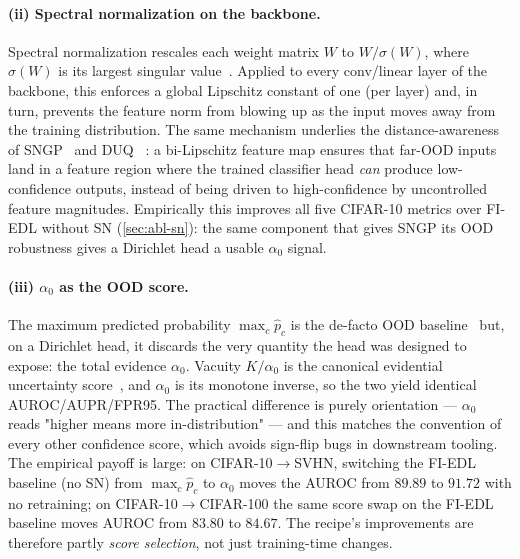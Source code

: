 \documentclass[review,5p,times]{elsarticle}
\begin{document}
\paragraph{(ii) Spectral normalization on the backbone.}
Spectral normalization rescales each weight matrix $W$ to
$W/\sigma(W)$, where $\sigma(W)$ is its largest singular
value~\citep{miyato2018sngan}. Applied to every conv/linear layer of the
backbone, this enforces a global Lipschitz constant of one (per layer) and,
in turn, prevents the feature norm from blowing up as the input moves away
from the training distribution. The same mechanism underlies the
distance-awareness of SNGP~\citep{liu2020sngp} and DUQ
~\citep{vanamersfoort2020duq}: a bi-Lipschitz feature map ensures that
far-OOD inputs land in a feature region where the trained classifier head
\emph{can} produce low-confidence outputs, instead of being driven to
high-confidence by uncontrolled feature magnitudes. Empirically this
improves all five CIFAR-10 metrics over FI-EDL without SN
(\autoref{sec:abl-sn}): the same component that gives SNGP its OOD
robustness gives a Dirichlet head a usable $\alpha_0$ signal.

\paragraph{(iii) $\alpha_0$ as the OOD score.}
The maximum predicted probability $\max_c\hat p_c$ is the de-facto OOD
baseline~\citep{hendrycks2017baseline} but, on a Dirichlet head, it discards
the very quantity the head was designed to expose: the total evidence
$\alpha_0$. Vacuity $K/\alpha_0$ is the canonical evidential uncertainty
score~\citep{sensoy2018edl}, and $\alpha_0$ is its monotone inverse, so the
two yield identical AUROC/AUPR/FPR95. The practical difference is purely
orientation — $\alpha_0$ reads "higher means more in-distribution" — and
this matches the convention of every other confidence score, which avoids
sign-flip bugs in downstream tooling. The empirical payoff is large: on
CIFAR-10$\to$SVHN, switching the FI-EDL baseline (no SN) from
$\max_c\hat p_c$ to $\alpha_0$ moves the AUROC from $89.89$ to $91.72$
with no retraining; on CIFAR-10$\to$CIFAR-100 the same score swap on the
FI-EDL baseline moves AUROC from $83.80$ to $84.67$. The recipe's
improvements are therefore partly \emph{score selection}, not just
training-time changes.
\end{document}
